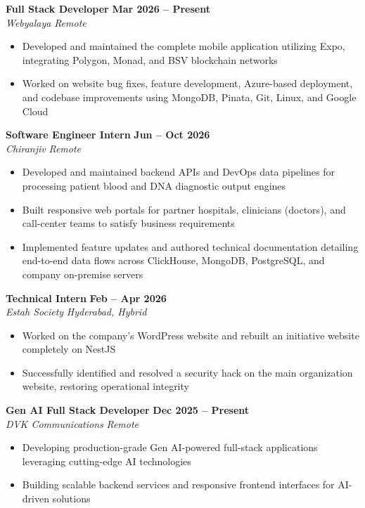\documentclass[11pt,a4paper]{article}
\begin{document}
\noindent \textbf{Full Stack Developer} \hfill \textbf{Mar 2026 -- Present} \\
\textit{Webyalaya} \hfill \textit{Remote}
\begin{itemize}[leftmargin=1.5em, itemsep=1pt, parsep=0pt, topsep=1.5pt]
  \item Developed and maintained the complete mobile application utilizing Expo, integrating Polygon, Monad, and BSV blockchain networks
  \item Worked on website bug fixes, feature development, Azure-based deployment, and codebase improvements using MongoDB, Pinata, Git, Linux, and Google Cloud
\end{itemize}
\vspace{2.5pt}

\noindent \textbf{Software Engineer Intern} \hfill \textbf{Jun -- Oct 2026} \\
\textit{Chiranjiv} \hfill \textit{Remote}
\begin{itemize}[leftmargin=1.5em, itemsep=1pt, parsep=0pt, topsep=1.5pt]
  \item Developed and maintained backend APIs and DevOps data pipelines for processing patient blood and DNA diagnostic output engines
  \item Built responsive web portals for partner hospitals, clinicians (doctors), and call-center teams to satisfy business requirements
  \item Implemented feature updates and authored technical documentation detailing end-to-end data flows across ClickHouse, MongoDB, PostgreSQL, and company on-premise servers
\end{itemize}
\vspace{2.5pt}

\noindent \textbf{Technical Intern} \hfill \textbf{Feb -- Apr 2026} \\
\textit{Estah Society} \hfill \textit{Hyderabad, Hybrid}
\begin{itemize}[leftmargin=1.5em, itemsep=1pt, parsep=0pt, topsep=1.5pt]
  \item Worked on the company's WordPress website and rebuilt an initiative website completely on NestJS
  \item Successfully identified and resolved a security hack on the main organization website, restoring operational integrity
\end{itemize}
\vspace{2.5pt}

\noindent \textbf{Gen AI Full Stack Developer} \hfill \textbf{Dec 2025 -- Present} \\
\textit{DVK Communications} \hfill \textit{Remote}
\begin{itemize}[leftmargin=1.5em, itemsep=1pt, parsep=0pt, topsep=1.5pt]
  \item Developing production-grade Gen AI-powered full-stack applications leveraging cutting-edge AI technologies
  \item Building scalable backend services and responsive frontend interfaces for AI-driven solutions
\end{itemize}
\vspace{2.5pt}
\end{document}
